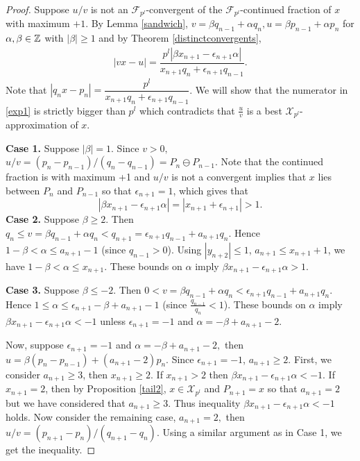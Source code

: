 \documentclass[12pt]{elsarticle}
\theoremstyle{definition}
\newcommand{\mX}{{\mathcal X}}
\newcommand{\f}{{\mathcal F}}
\newcommand{\ep}{\epsilon}
\begin{document}
{\begin{proof}
  		 Suppose $u/v$ is not an $\f_{p^l}$-convergent of the  $\f_{p^l}$-continued fraction of $x$ with maximum $+1$.  By Lemma \ref{sandwich}, 
  			$v=\beta q_{n-1}+\alpha q_n, u=\beta p_{n-1}+\alpha p_n$ for $\alpha,\beta\in\mathbb{Z}$ with $|\beta|\ge1$ and by Theorem \ref{distinctconvergents}, 
  			\begin{eqnarray}
  				|vx-u|=\dfrac{p^l |\beta x_{n+1}-\ep_{n+1}\alpha|}{x_{n+1}q_n+\ep_{n+1}q_{n-1}}.\label{exp1}
  			\end{eqnarray}
  			Note that $|q_nx-p_n|=\dfrac{p^l }{x_{n+1}q_n+\ep_{n+1}q_{n-1}}$. We will show
  			that the numerator in \eqref{exp1} is strictly bigger than $p^l$ which contradicts that $\frac{u}{v}$ is a best $\mX_{p^l}$-approximation of $x$.
  			
  		\noindent	\textbf{Case 1.} Suppose $|\beta|=1$. Since $v>0,$  $u/v=(p_{n}-p_{n-1})/(q_{n}-q_{n-1})=P_{n}\ominus P_{n-1}.$ Note that the continued fraction is with maximum +1 and $u/v$ is not a convergent implies that $x$ lies between $P_n$ and $P_{n-1}$ so that $\ep_{n+1}=1$, which gives that
  			$$|\beta x_{n+1}-\ep_{n+1}\alpha|=|x_{n+1}+\ep_{n+1}|>1.$$
%  			
  			\textbf{Case 2.} Suppose $\beta\ge2$.
  			Then  $q_n \le v=\beta q_{n-1}+\alpha q_{n} < q_{n+1}=\epsilon_{n+1}q_{n-1}+a_{n+1}q_{n}$. Hence
  			$1-\beta < \alpha \leq a_{n+1}-1$ (since $q_{n-1}>0$). Using $|y_{n+2}|\le1$, $a_{n+1}\le x_{n+1}+1$, we have
  			$1-\beta < \alpha \leq x_{n+1}$.
  			These bounds on $\alpha$ imply $\beta x_{n+1}-\ep_{n+1}\alpha > 1$.
  			
  		\noindent	\textbf{Case 3.} Suppose $\beta\le -2$. Then
  			$0<v=\beta q_{n-1}+\alpha q_{n} < \epsilon_{n+1}q_{n-1}+a_{n+1}q_{n}$. Hence
  			$1\leq \alpha\le\ep_{n+1}-\beta+a_{n+1}-1$ (since $\frac{q_{n-1}}{q_n}<1$). 	These bounds on $\alpha$ imply $\beta x_{n+1}-\ep_{n+1}\alpha<-1$ unless  $\ep_{n+1}=-1$ and $\alpha=-\beta+a_{n+1}-2$. 
  			
  			Now,
  			suppose $\ep_{n+1}=-1$ and $\alpha=-\beta+a_{n+1}-2,$ then $u=\beta(p_n-p_{n-1})+(a_{n+1}-2)p_n$. Since $\ep_{n+1}=-1$,  $a_{n+1}\ge2.$ First, we consider $a_{n+1}\ge3$, then  $x_{n+1}\ge2$. If $x_{n+1}>2$ then  $\beta x_{n+1}-\ep_{n+1}\alpha<-1$. If $x_{n+1}=2$, then by Proposition \ref{tail2}, $x\in\mX_{p^l}$ and $P_{n+1}=x$ so that $a_{n+1}=2$ but we have considered that $a_{n+1}\ge3$. Thus inequality $\beta x_{n+1}-\ep_{n+1}\alpha<-1$ holds. Now consider the remaining case, $a_{n+1}=2,$ then $u/v=(p_{n+1}-p_n)/(q_{n+1}-q_n).$ Using a similar argument as in Case 1, we get the inequality.
  		\end{proof}
  		
}
\end{document}
